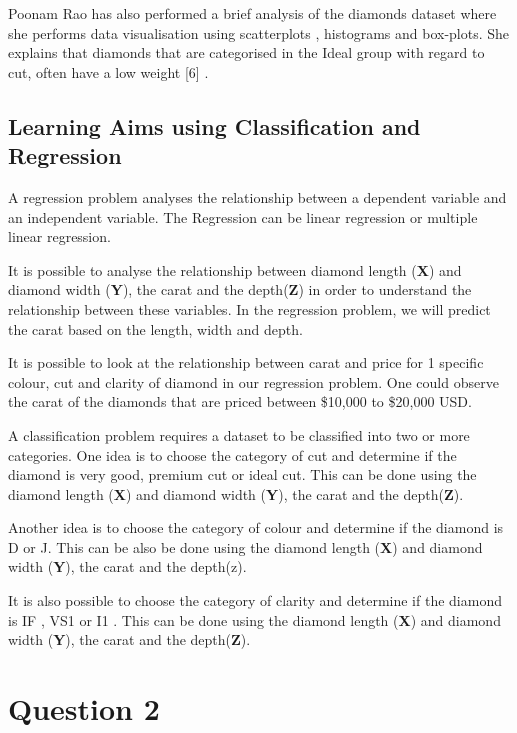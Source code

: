 \documentclass[
]{article}
\begin{document}
Poonam Rao has also performed a brief analysis of the diamonds dataset
where she performs data visualisation using scatterplots , histograms
and box-plots. She explains that diamonds that are categorised in the
Ideal group with regard to cut, often have a low weight {[}6{]} .

\subsection{Learning Aims using Classification and
Regression}\label{learning-aims-using-classification-and-regression}

A regression problem analyses the relationship between a dependent
variable and an independent variable. The Regression can be linear
regression or multiple linear regression.

It is possible to analyse the relationship between diamond length
(\textbf{X}) and diamond width (\textbf{Y}), the carat and the
depth(\textbf{Z}) in order to understand the relationship between these
variables. In the regression problem, we will predict the carat based on
the length, width and depth.

It is possible to look at the relationship between carat and price for 1
specific colour, cut and clarity of diamond in our regression problem.
One could observe the carat of the diamonds that are priced between
\$10,000 to \$20,000 USD.

A classification problem requires a dataset to be classified into two or
more categories. One idea is to choose the category of cut and determine
if the diamond is very good, premium cut or ideal cut. This can be done
using the diamond length (\textbf{X}) and diamond width (\textbf{Y}),
the carat and the depth(\textbf{Z}).

Another idea is to choose the category of colour and determine if the
diamond is D or J. This can be also be done using the diamond length
(\textbf{X}) and diamond width (\textbf{Y}), the carat and the depth(z).

It is also possible to choose the category of clarity and determine if
the diamond is IF , VS1 or I1 . This can be done using the diamond
length (\textbf{X}) and diamond width (\textbf{Y}), the carat and the
depth(\textbf{Z}).

\section{Question 2}\label{question-2}
\end{document}
